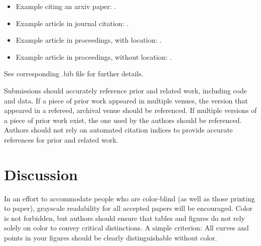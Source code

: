 \documentclass[11pt,a4paper]{article}
\begin{document}
\begin{itemize}
\item Example citing an arxiv paper: \cite{rasooli-tetrault-2015}. 
\item Example article in journal citation: \cite{Ando2005}.
\item Example article in proceedings, with location: \cite{borsch2011}.
\item Example article in proceedings, without location: \cite{andrew2007scalable}.
\end{itemize}
See corresponding .bib file for further details.

Submissions should accurately reference prior and related work, including code and data. If a piece of prior work appeared in multiple venues, the version that appeared in a refereed, archival venue should be referenced. If multiple versions of a piece of prior work exist, the one used by the authors should be referenced. Authors should not rely on automated citation indices to provide accurate references for prior and related work.


\section{Discussion}
\label{ssec:discussion}

In an effort to accommodate people who are color-blind (as well as those printing
to paper), grayscale readability for all accepted papers will be
encouraged.  Color is not forbidden, but authors should ensure that
tables and figures do not rely solely on color to convey critical
distinctions. A simple criterion: All curves and points in your figures should be clearly distinguishable without color.


\end{document}
